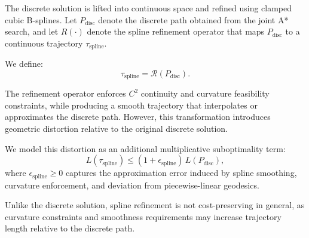 
The discrete solution is lifted into continuous space and refined using clamped cubic B-splines. Let \(P_{\text{disc}}\) denote the discrete path obtained from the joint A* search, and let \(R(\cdot)\) denote the spline refinement operator that maps \(P_{\text{disc}}\) to a continuous trajectory \(\tau_{\text{spline}}\).

We define:
\begin{equation}
\tau_{\mathrm{spline}} = \mathcal{R}(P_{\mathrm{disc}}).
\end{equation}

The refinement operator enforces $C^2$ continuity and curvature feasibility constraints, while producing a smooth trajectory that interpolates or approximates the discrete path. However, this transformation introduces geometric distortion relative to the original discrete solution.

We model this distortion as an additional multiplicative suboptimality term:
\begin{equation}
L(\tau_{\mathrm{spline}}) \le (1 + \epsilon_{\mathrm{spline}})\, L(P_{\mathrm{disc}}),
\end{equation}
where $\epsilon_{\mathrm{spline}} \ge 0$ captures the approximation error induced by spline smoothing, curvature enforcement, and deviation from piecewise-linear geodesics.

Unlike the discrete solution, spline refinement is not cost-preserving in general, as curvature constraints and smoothness requirements may increase trajectory length relative to the discrete path.